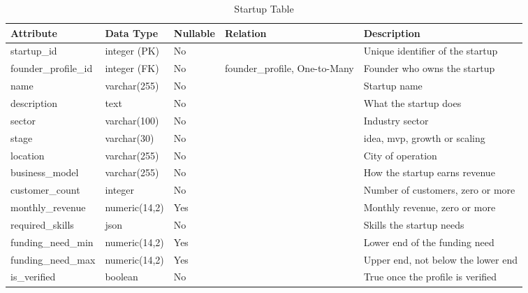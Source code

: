 \documentclass{FastFyp}
\newcommand{\ddhead}{\hline \textbf{Attribute} & \textbf{Data Type} & \textbf{Nullable} & \textbf{Relation} & \textbf{Description} \\ \hline}
\begin{document}
\begin{table}[!ht]
\centering
\caption{Startup Table}
\label{tab:dd-startup}
\begin{tabular}{|p{3.2cm}|p{2.5cm}|p{1.4cm}|p{2.9cm}|p{4.0cm}|}
\ddhead
startup\_id & integer (PK) & No &  & Unique identifier of the startup \\ \hline
founder\_profile\_id & integer (FK) & No & founder\_profile, One-to-Many & Founder who owns the startup \\ \hline
name & varchar(255) & No &  & Startup name \\ \hline
description & text & No &  & What the startup does \\ \hline
sector & varchar(100) & No &  & Industry sector \\ \hline
stage & varchar(30) & No &  & idea, mvp, growth or scaling \\ \hline
location & varchar(255) & No &  & City of operation \\ \hline
business\_model & varchar(255) & No &  & How the startup earns revenue \\ \hline
customer\_count & integer & No &  & Number of customers, zero or more \\ \hline
monthly\_revenue & numeric(14,2) & Yes &  & Monthly revenue, zero or more \\ \hline
required\_skills & json & No &  & Skills the startup needs \\ \hline
funding\_need\_min & numeric(14,2) & Yes &  & Lower end of the funding need \\ \hline
funding\_need\_max & numeric(14,2) & Yes &  & Upper end, not below the lower end \\ \hline
is\_verified & boolean & No &  & True once the profile is verified \\ \hline
\end{tabular}
\end{table}
\end{document}
